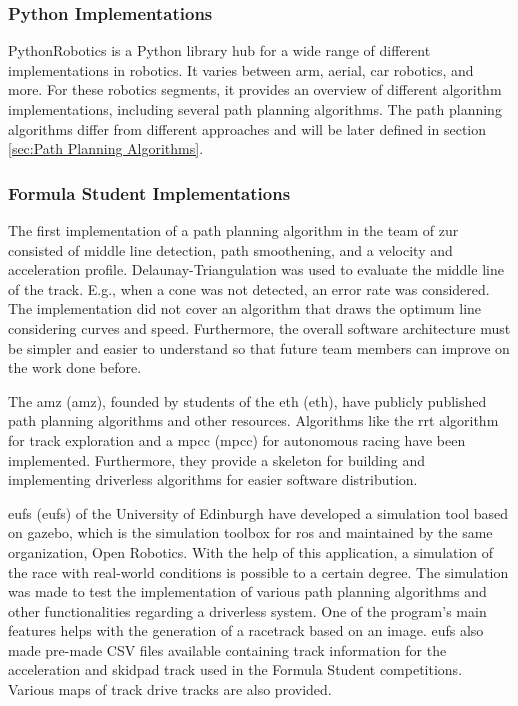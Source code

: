\subsubsection{Python Implementations} \label{sec:Python Implementations}
PythonRobotics is a Python library hub for a wide range of different implementations in robotics. It varies between arm, aerial, car robotics, and more.
For these robotics segments, it provides an overview of different algorithm implementations, including several path planning algorithms. \cite{python_robotics}
The path planning algorithms differ from different approaches and will be later defined in section \ref{sec:Path Planning Algorithms}.

\subsubsection{Formula Student Implementations} \label{sec:Formula Student Implementations}
The first implementation of a path planning algorithm in the team of \acrshort{zur} consisted of middle line detection, path smoothening, and a velocity and acceleration profile. Delaunay-Triangulation was used to evaluate the middle line of the track. E.g., when a cone was not detected, an error rate was considered. The implementation did not cover an algorithm that draws the optimum line considering curves and speed. Furthermore, the overall software architecture must be simpler and easier to understand so that future team members can improve on the work done before. \cite{autopilot_for_formula_student_jerome}

The \acrlong{amz} (\acrshort{amz}), founded by students of the \acrlong{eth} (\acrshort{eth}), \cite{amz_racing_about} have publicly published path planning algorithms and other resources. Algorithms like the \acrshort{rrt} algorithm for track exploration and a \acrlong{mpcc} (\acrshort{mpcc}) for autonomous racing have been implemented. Furthermore, they provide a skeleton for building and implementing driverless algorithms for easier software distribution. \cite{amz_racing_github}

\acrlong{eufs} (\acrshort{eufs}) of the University of Edinburgh have developed a simulation tool based on \Gls{gazebo}, which is the simulation toolbox for \acrshort{ros} and maintained by the same organization, Open Robotics. \cite{gazebo_simulator} With the help of this application, a simulation of the race with real-world conditions is possible to a certain degree. The simulation was made to test the implementation of various path planning algorithms and other functionalities regarding a driverless system. One of the program's main features helps with the generation of a racetrack based on an image. \acrshort{eufs} also made pre-made CSV files available containing track information for the acceleration and skidpad track used in the Formula Student competitions. Various maps of track drive tracks are also provided. \cite{eufs_path_planning_and_control} \cite{eufs_sim_gitlab}

